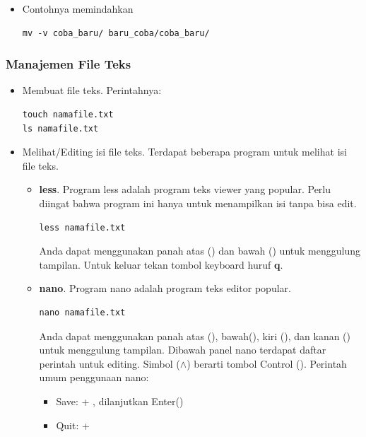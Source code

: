\documentclass[12pt,]{article}
\begin{document}
\begin{itemize}
\begin{itemize}
			\item Contohnya memindahkan
			\begin{verbatim}
mv -v coba_baru/ baru_coba/coba_baru/
			\end{verbatim}
		\end{itemize}

	\end{itemize}

	\subsubsection{Manajemen File Teks}
	\begin{itemize}
		\item Membuat file teks.
		Perintahnya:
		\begin{verbatim}
touch namafile.txt
ls namafile.txt
		\end{verbatim}

		\item Melihat/Editing isi file teks.
		Terdapat beberapa program untuk melihat isi file teks.
		\begin{itemize}
			\item \textbf{less}. Program less adalah program teks viewer yang popular.
			Perlu diingat bahwa program ini hanya untuk menampilkan isi tanpa bisa edit.
			\begin{verbatim}
less namafile.txt
			\end{verbatim}
			Anda dapat menggunakan panah atas (\keys{\arrowkeyup}) dan bawah (\keys{\arrowkeydown}) untuk menggulung tampilan.
			Untuk keluar tekan tombol keyboard huruf \textbf{q}.

			\item \textbf{nano}. Program nano adalah program teks editor popular.
			\begin{verbatim}
nano namafile.txt
			\end{verbatim}
			Anda dapat menggunakan panah atas (\keys{\arrowkeyup}), bawah(\keys{\arrowkeydown}),
			kiri (\keys{\arrowkeyleft}), dan kanan (\keys{\arrowkeyright}) untuk menggulung tampilan.
			Dibawah panel nano terdapat daftar perintah untuk editing.
			Simbol ($\land$) berarti tombol Control ().
			Perintah umum penggunaan nano:
			\begin{itemize}
				\item Save:  + , dilanjutkan Enter(\keys{\return})
				\item Quit:  + 
			\end{itemize}


\end{itemize}
\end{itemize}
\end{document}
